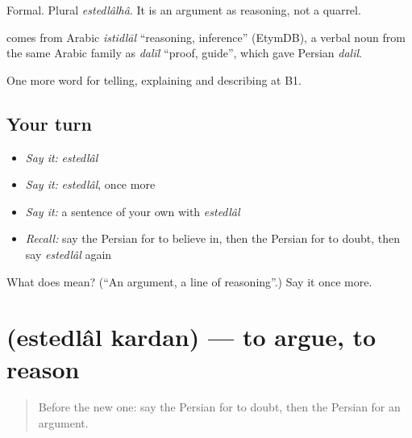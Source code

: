 Formal. Plural \emph{estedlâlhâ}. It is an argument as reasoning, not a quarrel.

\begin{cousinweb}
\textbf{} comes from Arabic \emph{istidlāl} \textquotedblleft{}reasoning, inference\textquotedblright{} (EtymDB), a verbal noun from the same Arabic family as \emph{dalīl} \textquotedblleft{}proof, guide\textquotedblright{}, which gave Persian \emph{dalil}.
\end{cousinweb}

\begin{grammarlens}[title={What you've built}]
One more word for telling, explaining and describing at B1.
\end{grammarlens}

\subsection*{Your turn}
\begin{itemize}
\raggedright
  \item \emph{Say it:} \emph{estedlâl}
  \item \emph{Say it:} \emph{estedlâl}, once more
  \item \emph{Say it:} a sentence of your own with \emph{estedlâl}
  \item \emph{Recall:} say the Persian for to believe in, then the Persian for to doubt, then say \emph{estedlâl} again
\end{itemize}

\begin{tcolorbox}[breakable,colback=teal!4,colframe=teal!35!black,title={Before you move on}]
What does  mean? (\textquotedblleft{}An argument, a line of reasoning\textquotedblright{}.) Say it once more.
\end{tcolorbox}
\section[\texorpdfstring{\fa{استدلال} \fa{کردن} (estedlâl kardan)}{استدلال کردن (estedlâl kardan)}]{  (estedlâl kardan) — to argue, to reason}

\label{lesson:FA-C362-estedlal-kardan}



\begin{quote}
Before the new one: say the Persian for to doubt, then the Persian for an argument.
\end{quote}


